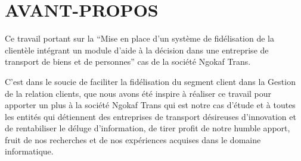 \chapter*{AVANT-PROPOS}
Ce travail portant sur la \enquote{Mise en place d’un système de
fidélisation de la clientèle intégrant un module d’aide à la
décision dans une entreprise de transport
de biens et de personnes} cas de la société Ngokaf Trans.
\par
C’est dans le soucie de faciliter la fidélisation du segment client
dans la Gestion de la relation clients, que nous avons été inspire
à réaliser ce travail pour apporter un plus à la société Ngokaf Trans
qui est notre cas d’étude et à toutes les entités qui détiennent des entreprises
de transport désireuses d’innovation et de rentabiliser le 
déluge d’information, de tirer profit de notre humble apport, fruit
de nos recherches et de nos expériences acquises dans le domaine informatique.